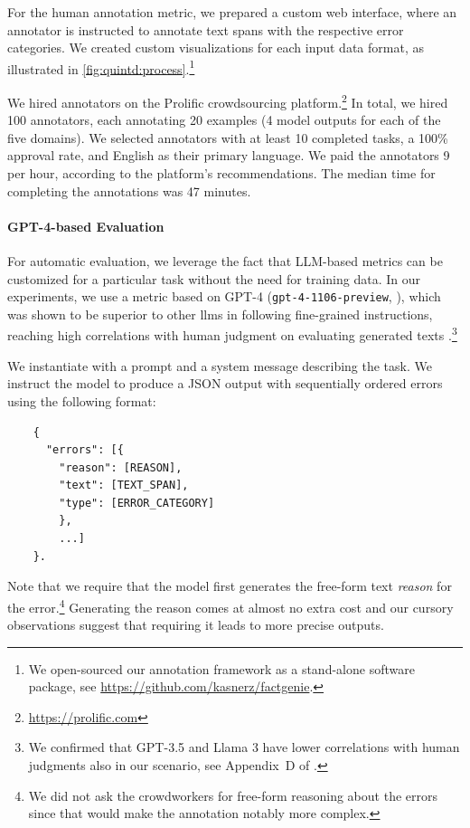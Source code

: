 
For the human annotation metric, we prepared a custom web interface, where
an annotator is instructed to annotate text spans with the respective error categories. We created custom visualizations for each input data format, as illustrated in \autoref{fig:quintd:process}.\footnote{We open-sourced our annotation framework as a stand-alone software package, see \url{https://github.com/kasnerz/factgenie}.}

We hired annotators on the Prolific crowdsourcing platform.\footnote{\url{https://prolific.com}} In total, we hired 100 annotators, each annotating 20 examples (4 model outputs for each of the five domains). We selected annotators with at least 10 completed tasks, a 100\% approval rate, and English as their primary language. We paid the annotators \textsterling{}9 per hour, according to the platform's recommendations. The median time for completing the annotations was 47 minutes.




\paragraph{GPT-4-based Evaluation}
\label{sec:quintd:gpt4eval}

For automatic evaluation, we leverage the fact that LLM-based metrics can be customized for a particular task without the need for training data. In our experiments, we use a metric based on GPT-4 (\texttt{gpt-4-1106-preview}, \citealp{openai2023gpt4}), which was shown to be superior to other \acp{llm} in following fine-grained instructions, reaching high correlations with human judgment on evaluating generated texts \cite{zhaoInvestigatingTabletoTextGeneration2023,sottanaEvaluationMetricsEra2023,kocmiGEMBAMQMDetectingTranslation2023,kocmiLargeLanguageModels2023}.\footnote{We confirmed that GPT-3.5 and Llama 3 have lower correlations with human judgments also in our scenario, see Appendix~D of \citet{kasnerReferenceBasedMetricsAnalyzing2024}.}

We instantiate \gptmetric{} with a prompt and a system message describing the task. We instruct the model to produce a JSON output with sequentially ordered errors using the following format:
\small
\begin{verbatim}
    {
      "errors": [{
        "reason": [REASON],
        "text": [TEXT_SPAN],
        "type": [ERROR_CATEGORY]
        }, 
        ...]
    }.
\end{verbatim}
\normalsize
Note that we require that the model first generates the free-form text \textit{reason} for the error.\footnote{We did not ask the crowdworkers for free-form reasoning about the errors since that would make the annotation notably more complex.} Generating the reason comes at almost no extra cost and our cursory observations suggest that requiring it leads to more precise outputs.

